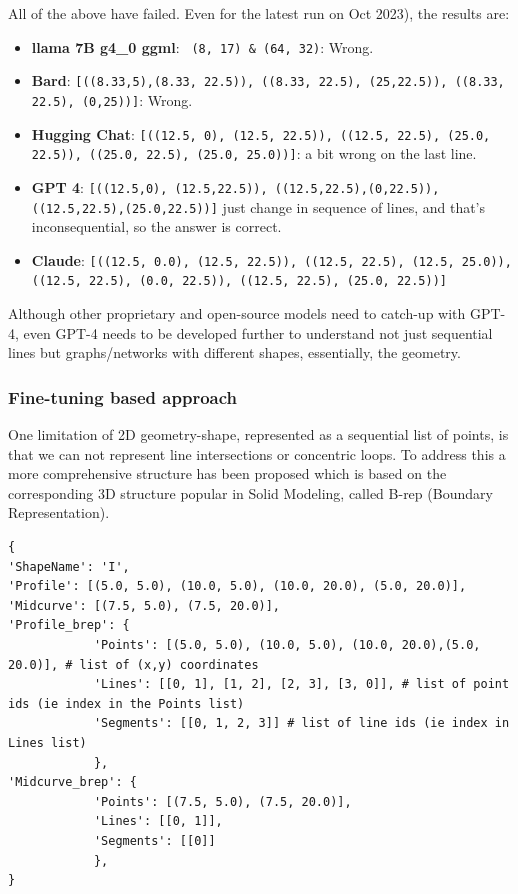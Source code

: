 \documentclass[10pt, conference]{IEEEtran}
\begin{document}
All of the above have failed. Even for the latest run on Oct 2023), the results are:
	\begin{itemize}
	\item {\bf llama 7B g4\_0 ggml}: \lstinline[basicstyle=\tiny, breaklines=true, breakatwhitespace=true]| (8, 17) & (64, 32)|: Wrong.
	\item {\bf Bard}: \lstinline[basicstyle=\tiny, breaklines=true, breakatwhitespace=true]|[((8.33,5),(8.33, 22.5)), ((8.33, 22.5), (25,22.5)), ((8.33, 22.5), (0,25))]|: Wrong.
	\item {\bf Hugging Chat}:  \lstinline[basicstyle=\tiny, breaklines=true, breakatwhitespace=true]|[((12.5, 0), (12.5, 22.5)), ((12.5, 22.5), (25.0, 22.5)), ((25.0, 22.5), (25.0, 25.0))]|: a bit wrong on the last line.
	\item {\bf GPT 4}:  \lstinline[basicstyle=\tiny, breaklines=true, breakatwhitespace=true]|[((12.5,0), (12.5,22.5)), ((12.5,22.5),(0,22.5)), ((12.5,22.5),(25.0,22.5))]| just change in sequence of lines, and that's inconsequential, so the answer is correct.
	\item {\bf Claude}:  \lstinline[basicstyle=\tiny, breaklines=true, breakatwhitespace=true]|[((12.5, 0.0), (12.5, 22.5)), ((12.5, 22.5), (12.5, 25.0)), ((12.5, 22.5), (0.0, 22.5)), ((12.5, 22.5), (25.0, 22.5))]|
\end{itemize}		    
    
Although other proprietary and open-source models need to catch-up with GPT-4, even GPT-4 needs to be developed further to understand not just sequential lines but graphs/networks with different shapes, essentially, the geometry.

\subsubsection{Fine-tuning based approach}
\label{subsubsec:2} 

One limitation of 2D geometry-shape, represented as a sequential list of points, is that we can not represent line intersections or concentric loops. To address this a more comprehensive structure has been proposed which is based on the corresponding 3D structure popular in Solid Modeling, called B-rep (Boundary Representation).

\begin{lstlisting}[basicstyle=\tiny, breaklines=true, breakatwhitespace=true, label=lst:python]
{
'ShapeName': 'I',
'Profile': [(5.0, 5.0), (10.0, 5.0), (10.0, 20.0), (5.0, 20.0)],
'Midcurve': [(7.5, 5.0), (7.5, 20.0)],
'Profile_brep': {
			'Points': [(5.0, 5.0), (10.0, 5.0), (10.0, 20.0),(5.0, 20.0)], # list of (x,y) coordinates
			'Lines': [[0, 1], [1, 2], [2, 3], [3, 0]], # list of point ids (ie index in the Points list)
			'Segments': [[0, 1, 2, 3]] # list of line ids (ie index in Lines list)
			},
'Midcurve_brep': {
			'Points': [(7.5, 5.0), (7.5, 20.0)],
			'Lines': [[0, 1]],
			'Segments': [[0]]
			},				
}
\end{lstlisting}
\end{document}
